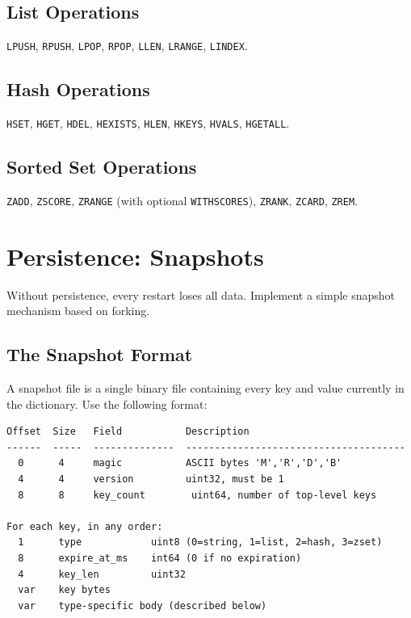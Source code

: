\documentclass[11pt,a4paper]{article}
\begin{document}
\subsection{List Operations}
\texttt{LPUSH}, \texttt{RPUSH}, \texttt{LPOP}, \texttt{RPOP}, \texttt{LLEN}, \texttt{LRANGE}, \texttt{LINDEX}.

\subsection{Hash Operations}
\texttt{HSET}, \texttt{HGET}, \texttt{HDEL}, \texttt{HEXISTS}, \texttt{HLEN}, \texttt{HKEYS}, \texttt{HVALS}, \texttt{HGETALL}.

\subsection{Sorted Set Operations}
\texttt{ZADD}, \texttt{ZSCORE}, \texttt{ZRANGE} (with optional \texttt{WITHSCORES}), \texttt{ZRANK}, \texttt{ZCARD}, \texttt{ZREM}.

\section{Persistence: Snapshots}

Without persistence, every restart loses all data. Implement a simple snapshot mechanism based on forking.

\subsection{The Snapshot Format}
A snapshot file is a single binary file containing every key and value currently in the dictionary. Use the following format:

\begin{codebox}
\begin{lstlisting}
Offset  Size   Field           Description
------  -----  --------------  --------------------------------------
  0      4     magic           ASCII bytes 'M','R','D','B'
  4      4     version         uint32, must be 1
  8      8     key_count        uint64, number of top-level keys

For each key, in any order:
  1      type            uint8 (0=string, 1=list, 2=hash, 3=zset)
  8      expire_at_ms    int64 (0 if no expiration)
  4      key_len         uint32
  var    key bytes
  var    type-specific body (described below)
\end{lstlisting}
\end{codebox}
\end{document}
